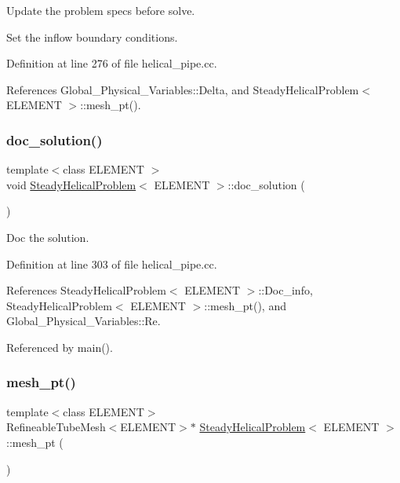 Update the problem specs before solve. 

Set the inflow boundary conditions. 

Definition at line 276 of file helical\+\_\+pipe.\+cc.



References Global\+\_\+\+Physical\+\_\+\+Variables\+::\+Delta, and Steady\+Helical\+Problem$<$ E\+L\+E\+M\+E\+N\+T $>$\+::mesh\+\_\+pt().

\mbox{\label{classSteadyHelicalProblem_af233588050a06523cd93f8bcdb0fa54c}} 
\subsubsection{\texorpdfstring{doc\+\_\+solution()}{doc\_solution()}}
{\footnotesize\ttfamily template$<$class E\+L\+E\+M\+E\+NT $>$ \\
void \hyperlink{classSteadyHelicalProblem}{Steady\+Helical\+Problem}$<$ E\+L\+E\+M\+E\+NT $>$\+::doc\+\_\+solution (\begin{DoxyParamCaption}{ }\end{DoxyParamCaption})}



Doc the solution. 



Definition at line 303 of file helical\+\_\+pipe.\+cc.



References Steady\+Helical\+Problem$<$ E\+L\+E\+M\+E\+N\+T $>$\+::\+Doc\+\_\+info, Steady\+Helical\+Problem$<$ E\+L\+E\+M\+E\+N\+T $>$\+::mesh\+\_\+pt(), and Global\+\_\+\+Physical\+\_\+\+Variables\+::\+Re.



Referenced by main().

\mbox{\label{classSteadyHelicalProblem_a8962f49b4abe06419311e2e9b312da67}} 
\subsubsection{\texorpdfstring{mesh\+\_\+pt()}{mesh\_pt()}}
{\footnotesize\ttfamily template$<$class E\+L\+E\+M\+E\+NT$>$ \\
Refineable\+Tube\+Mesh$<$E\+L\+E\+M\+E\+NT$>$$\ast$ \hyperlink{classSteadyHelicalProblem}{Steady\+Helical\+Problem}$<$ E\+L\+E\+M\+E\+NT $>$\+::mesh\+\_\+pt (\begin{DoxyParamCaption}{ }\end{DoxyParamCaption})\hspace{0.3cm}{\ttfamily [inline]}}




